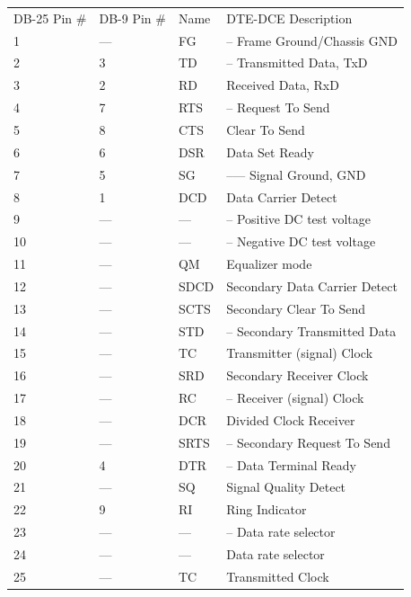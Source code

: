{{{{{{{{{{
\begin{longtable}{llll}
{DB-25 Pin \#} & {DB-9 Pin \#} & {Name} & {DTE-DCE Description 
 } \\
{1} & {{---}} & {FG} & {{--} Frame Ground/Chassis GND 
 } \\
{2} & {3} & {TD} & {{--}\gt{} Transmitted Data, TxD 
 } \\
{3} & {2} & {RD} & {\lt{}{--} Received Data, RxD 
 } \\
{4} & {7} & {RTS} & {{--}\gt{} Request To Send 
 } \\
{5} & {8} & {CTS} & {\lt{}{--} Clear To Send 
 } \\
{6} & {6} & {DSR} & {\lt{}{--} Data Set Ready 
 } \\
{7} & {5} & {SG} & {{--}{---} Signal Ground, GND 
 } \\
{8} & {1} & {DCD} & {\lt{}{--} Data Carrier Detect 
 } \\
{9} & {{---}} & {{---}} & {{--} Positive DC test voltage 
 } \\
{10} & {{---}} & {{---}} & {{--} Negative DC test voltage 
 } \\
{11} & {{---}} & {QM} & {\lt{}{--} Equalizer mode 
 } \\
{12} & {{---}} & {SDCD} & {\lt{}{--} Secondary Data Carrier Detect 
 } \\
{13} & {{---}} & {SCTS} & {\lt{}{--} Secondary Clear To Send 
 } \\
{14} & {{---}} & {STD} & {{--}\gt{} Secondary Transmitted Data 
 } \\
{15} & {{---}} & {TC} & {\lt{}{--} Transmitter (signal) Clock 
 } \\
{16} & {{---}} & {SRD} & {\lt{}{--} Secondary Receiver Clock 
 } \\
{17} & {{---}} & {RC} & {{--}\gt{} Receiver (signal) Clock 
 } \\
{18} & {{---}} & {DCR} & {\lt{}{--} Divided Clock Receiver 
 } \\
{19} & {{---}} & {SRTS} & {{--}\gt{} Secondary Request To Send 
 } \\
{20} & {4} & {DTR} & {{--}\gt{} Data Terminal Ready 
 } \\
{21} & {{---}} & {SQ} & {\lt{}{--} Signal Quality Detect 
 } \\
{22} & {9} & {RI} & {\lt{}{--} Ring Indicator 
 } \\
{23} & {{---}} & {{---}} & {{--}\gt{} Data rate selector 
 } \\
{24} & {{---}} & {{---}} & {\lt{}{--} Data rate selector 
 } \\
{25} & {{---}} & {TC} & {\lt{}{--} Transmitted Clock  
}


\end{longtable}}}}}}}}}}}
